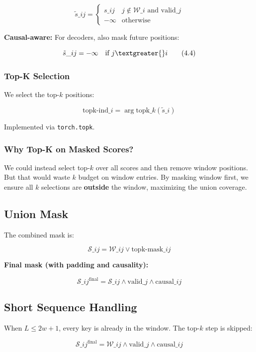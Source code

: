 \[
\tilde{s}\_{ij} = \begin{cases} s\_{ij} & j \notin \mathcal{W}\_i \text{ and valid}\_j \\ -\infty & \text{otherwise} \end{cases}
\tag{4.3}
\]

\textbf{Causal-aware:} For decoders, also mask future positions:

\[
\tilde{s}\_{ij} = -\infty \quad \text{if } j \textgreater{} i
\tag{4.4}
\]

\subsubsection{Top-K Selection}

We select the top-$k$ positions:

\[
\text{topk-ind}\_i = \arg\text{topk}\_{k}(\tilde{s}\_i)
\tag{4.5}
\]

Implemented via \texttt{torch.topk}.

\subsubsection{Why Top-K on Masked Scores?}

We could instead select top-$k$ over all scores and then remove window 
positions. But that would waste $k$ budget on window entries. By masking 
window first, we ensure all $k$ selections are \textbf{outside} the window, 
maximizing the union coverage.

\subsection{Union Mask}

The combined mask is:

\[
\mathcal{S}\_{ij} = \mathcal{W}\_{ij} \lor \text{topk-mask}\_{ij}
\tag{4.6}
\]

\textbf{Final mask (with padding and causality):}

\[
\mathcal{S}\_{ij}^\text{final} = \mathcal{S}\_{ij} \land \text{valid}\_j \land \text{causal}\_{ij}
\tag{4.7}
\]

\subsection{Short Sequence Handling}

When $L \leq 2w + 1$, every key is already in the window. The top-$k$ step 
is skipped:

\[
\mathcal{S}\_{ij}^\text{final} = \mathcal{W}\_{ij} \land \text{valid}\_j \land \text{causal}\_{ij}
\tag{4.8}
\]

